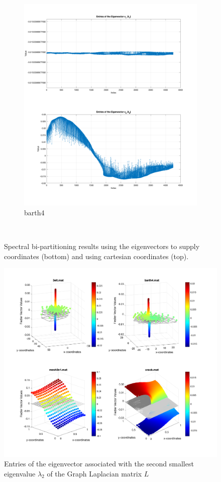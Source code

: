 \begin{figure}[H]
\begin{subfigure}{0.5\textwidth}
		\includegraphics[width=\textwidth]{./media/eig_2.png}
		\caption{barth4}
		\label{fig:coord_crack}
	\end{subfigure}\\
	\caption{Spectral bi-partitioning results using the eigenvectors to supply coordinates (bottom) and using cartesian coordinates (top).}
	\label{fig:rec_bi}
\end{figure}

\begin{figure}[H]
	\centering
	\includegraphics[width=\textwidth]{./media/fiedler.png}
	\caption{Entries of the eigenvector associated with the second smallest eigenvalue $\lambda_2$ of the Graph Laplacian matrix $L$}
	\label{fig:fied}
\end{figure}

